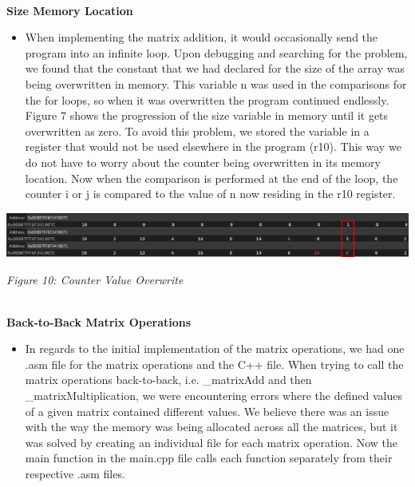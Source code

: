 \documentclass[twoside]{article}
\begin{document}
\noindent \\ \textbf{Size Memory Location}
\begin{itemize}
\item When implementing the matrix addition, it would occasionally send the program into an infinite loop. Upon debugging and searching for the problem, we found that the constant that we had declared for the size of the array was being overwritten in memory. This variable n was used in the comparisons for the for loops, so when it was overwritten the program continued endlessly. Figure 7 shows the progression of the size variable in memory until it gets overwritten as zero. To avoid this problem, we stored the variable in a register that would not be used elsewhere in the program (r10). This way we do not have to worry about the counter being overwritten in its memory location. Now when the comparison is performed at the end of the loop, the counter i or j is compared to the value of n now residing in the r10 register.
\end{itemize}
\centerline{\includegraphics[scale=2]{images/countervalueoverwrite.png}}
\begin{center}\textit{Figure 10: Counter Value Overwrite}\end{center}

\noindent \\ \textbf{Back-to-Back Matrix Operations}
\begin{itemize}
\item In regards to the initial implementation of the matrix operations, we had one .asm file for the matrix operations and the C++ file. When trying to call the matrix operations back-to-back, i.e. \_matrixAdd and then \_matrixMultiplication, we were encountering errors where the defined values of a given matrix contained different values. We believe there was an issue with the way the memory was being allocated across all the matrices, but it was solved by creating an individual file for each matrix operation. Now the main function in the main.cpp file calls each function separately from their respective .asm files.
\end{itemize}
\end{document}
